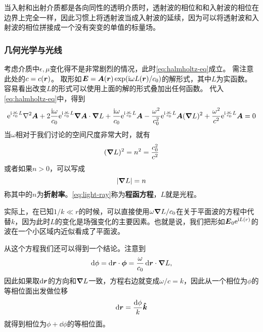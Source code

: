 \documentclass[UTF8, a4paper]{ctexart}
\newcommand*{\ii}{\mathrm{i}}
\newcommand*{\ee}{\mathrm{e}}
\begin{document}
当入射和出射介质都是各向同性的透明介质时，透射波的相位和和入射波的相位在边界上完全一样，因此习惯上将透射波当成入射波的延续，因为可以将透射波和入射波的相位拼接成一个没有突变的单值的标量场。

\subsubsection{几何光学与光线}

考虑介质中$\epsilon, \mu$变化得不是非常剧烈的情况，此时\eqref{eq:halmholtz-eq}成立。
需注意此处的$c=c(\vb*{r})$。
取形如$\vb*{E} = \vb*{A}(\vb*{r}) \exp (\ii \omega L(\vb*{r}) / c_0)$的解形式，其中$L$为实函数。
容易看出改变$L$的形式可以使用上面的解的形式叠加出任何函数。
代入\eqref{eq:halmholtz-eq}中，得到
\[
    \ee^{\ii \frac{\omega}{c_0} L} \laplacian \vb*{A} 
    + 2 \frac{\ii \omega}{c_0} \ee^{\ii \frac{\omega}{c_0} L} \grad{\vb*{A}} \cdot \grad{L} 
    + \frac{\ii \omega}{c_0} \ee^{\ii \frac{\omega}{c_0} L} \vb*{A} 
    - \frac{\omega^2}{c_0^2} \ee^{\ii \frac{\omega}{c_0} L} \vb*{A} (\grad{L})^2 
    + \frac{\omega^2}{c^2} \ee^{\ii \frac{\omega}{c_0} L} \vb*{A} = 0
\]
当$\omega$相对于我们讨论的空间尺度非常大时，就有
\begin{equation}
    (\grad{L})^2 = n^2 = \frac{c_0^2}{c^2}
    \label{eq:optical-distance}
\end{equation}
或者如果$n>0$，可以写成
\[
    \abs{\grad{L}} = n
\]
称其中的$n$为\textbf{折射率}。\eqref{eq:light-ray}称为\textbf{程函方程}，$L$就是光程。

实际上，在已知$1/k \ll r$的时候，可以直接使用$\omega\grad{L}/c_0$在关于平面波的方程中代替$k$，因为此时$L$的变化是场强变化的主要因素。也就是说，我们把形如$\vb*{E}_0 \ee^{\ii L(r)}$的波在一个小区域内近似看成了平面波。

从这个方程我们还可以得到一个结论。注意到
\[
    \dd{\phi} = \dd{\vb*{r}} \cdot \vb*{\phi} = \frac{\omega}{c_0} \dd{\vb*{r}} \cdot \grad{L},
\]
因此如果取$\dd{\vb*{r}}$的方向和$\grad{L}$一致，方程右边就变成$\omega / c = k$，因此从一个相位为$\phi$的等相位面出发做位移
\begin{equation}
    \dd{\vb*{r}} = \frac{\dd{\phi}}{k}\vu*{k}
    \label{eq:phrase-movement}
\end{equation}
就得到相位为$\phi + \dd{\phi}$的等相位面。
\end{document}
